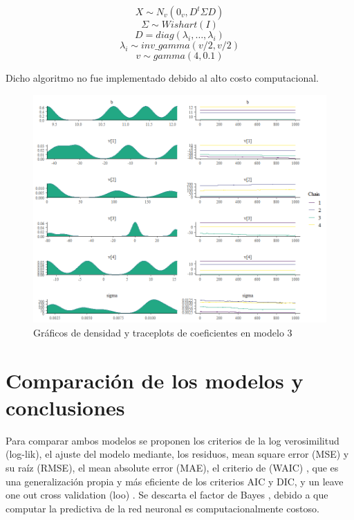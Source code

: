 \documentclass[nojss]{jss}
\begin{document}
$$X \sim N_v(0_v,D^t\Sigma D)$$
$$\Sigma  \sim Wishart(I)$$
$$D = diag(\lambda_i,\ldots,\lambda_i)$$
$$\lambda_i \sim inv\_gamma(v/2,v/2)$$
$$v \sim gamma(4,0.1)$$

Dicho algoritmo no fue implementado debido al alto costo computacional.


\begin{figure}[H]
	\centering
	\includegraphics[scale=0.8]{images/traceplot3}
	\caption[trace3]{Gráficos de densidad y traceplots de coeficientes en modelo 3}
	\label{fig:fig8}
\end{figure}


\section{Comparación de los modelos y conclusiones}

Para comparar ambos modelos se proponen los criterios de la log verosimilitud (log-lik), el ajuste del modelo mediante, los residuos, mean square error (MSE) y su raíz (RMSE), el mean absolute error (MAE), el criterio de \cite{watanabe} (WAIC) , que es una generalización propia y más eficiente de los criterios AIC y DIC,  y un leave one out cross validation (loo) \cite{loo}.  Se descarta el factor de Bayes \cite{bayesfactor}, debido a que computar la predictiva de la red neuronal es computacionalmente costoso.\\
\end{document}
